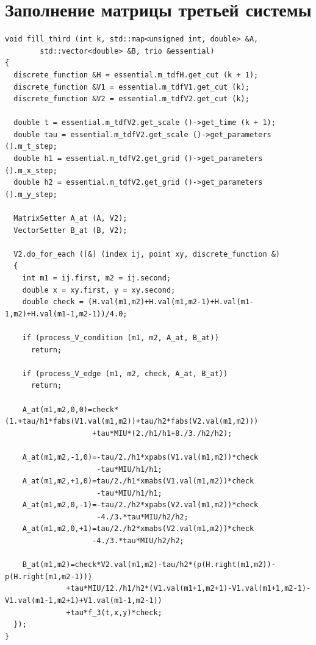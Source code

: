 \documentclass[a4paper,11pt]{article}
\begin{document}
\section{Заполнение матрицы третьей системы}
\begin{verbatim}
void fill_third (int k, std::map<unsigned int, double> &A, 
		std::vector<double> &B, trio &essential)
{
  discrete_function &H = essential.m_tdfH.get_cut (k + 1);
  discrete_function &V1 = essential.m_tdfV1.get_cut (k);
  discrete_function &V2 = essential.m_tdfV2.get_cut (k);

  double t = essential.m_tdfV2.get_scale ()->get_time (k + 1);
  double tau = essential.m_tdfV2.get_scale ()->get_parameters ().m_t_step;
  double h1 = essential.m_tdfV2.get_grid ()->get_parameters ().m_x_step;
  double h2 = essential.m_tdfV2.get_grid ()->get_parameters ().m_y_step;

  MatrixSetter A_at (A, V2);
  VectorSetter B_at (B, V2);

  V2.do_for_each ([&] (index ij, point xy, discrete_function &)
  {
    int m1 = ij.first, m2 = ij.second;
    double x = xy.first, y = xy.second;
    double check = (H.val(m1,m2)+H.val(m1,m2-1)+H.val(m1-1,m2)+H.val(m1-1,m2-1))/4.0;

    if (process_V_condition (m1, m2, A_at, B_at))
      return;

    if (process_V_edge (m1, m2, check, A_at, B_at))
      return;

    A_at(m1,m2,0,0)=check*(1.+tau/h1*fabs(V1.val(m1,m2))+tau/h2*fabs(V2.val(m1,m2)))
                    +tau*MIU*(2./h1/h1+8./3./h2/h2);

    A_at(m1,m2,-1,0)=-tau/2./h1*xpabs(V1.val(m1,m2))*check
                     -tau*MIU/h1/h1;
    A_at(m1,m2,+1,0)=tau/2./h1*xmabs(V1.val(m1,m2))*check
                     -tau*MIU/h1/h1;
    A_at(m1,m2,0,-1)=-tau/2./h2*xpabs(V2.val(m1,m2))*check
                     -4./3.*tau*MIU/h2/h2;
    A_at(m1,m2,0,+1)=tau/2./h2*xmabs(V2.val(m1,m2))*check
                    -4./3.*tau*MIU/h2/h2;

    B_at(m1,m2)=check*V2.val(m1,m2)-tau/h2*(p(H.right(m1,m2))-p(H.right(m1,m2-1)))
              +tau*MIU/12./h1/h2*(V1.val(m1+1,m2+1)-V1.val(m1+1,m2-1)-V1.val(m1-1,m2+1)+V1.val(m1-1,m2-1))
              +tau*f_3(t,x,y)*check;
  });
}
\end{verbatim}
\end{document}
